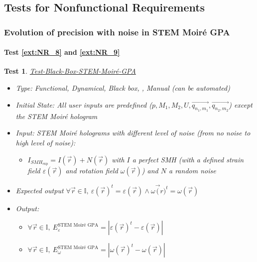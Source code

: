 \documentclass[12pt, titlepage]{article}
\newcommand{\progname}{STEM Moir{\'e} GPA}
\newtheorem{Test}{Test}
\begin{document}
\subsection{Tests for Nonfunctional Requirements}

\subsubsection{Evolution of precision with noise in \progname{}}
		
\paragraph{Test \cref{ext:NR_8} and \cref{ext:NR_9}}						

\begin{Test}\normalfont\underline{Test-Black-Box-STEM-Moir{\'e}-GPA}
\label{black_box_STEM_Moire_GPA}
\begin{itemize}
\item Type: Functional, Dynamical, Black box, , Manual (can be automated)
\item Initial State: All user inputs are predefined ($p,M_1,M_2,U,\overrightarrow{q_{n_1,m_1}},\overrightarrow{q_{n_2,m_2}}$) except the STEM Moir{\'e} hologram
\item Input: STEM Moir{\'e} holograms with different level of noise (from no noise to high level of noise): 
	\begin{itemize}
	\item	$I_{\mathit{SMH}_\text{exp}} = I(\vec{r}) + N(\vec{r})$ with $I$ a perfect SMH (with a defined strain field $\varepsilon(\vec{r})$ and rotation field $\omega(\vec{r})$) and $N$ a random noise
	\end{itemize}
\item Expected output $\forall \vec{r} \in \mathbb{I}, \ \varepsilon(\vec{r})^{t}=\varepsilon(\vec{r}) \wedge \omega\vec({r})^{t}=\omega(\vec{r})$
\item Output:
	\begin{itemize}
	\item $\forall \vec{r} \in \mathbb{I}, \ E^{\text{\progname{}}}_{\varepsilon}=|\varepsilon(\vec{r})^{t}-\varepsilon(\vec{r})|$
	\item $\forall \vec{r} \in \mathbb{I}, \ E^{\text{\progname{}}}_{\omega}=|\omega(\vec{r})^{t}-\omega(\vec{r})|$
	\end{itemize}
\end{itemize}
\end{Test}
\end{document}
